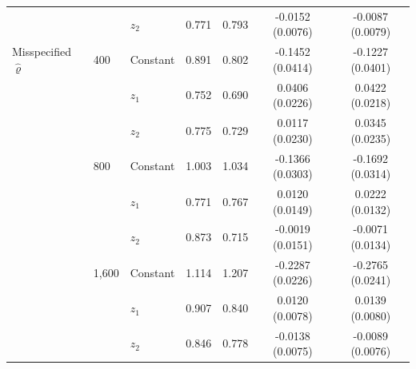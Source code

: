 \begin{tabular}{lllcccc}
 &  & $z_2$ & 0.771 & 0.793 & -0.0152 (0.0076) & -0.0087 (0.0079) \\
\addlinespace
Misspecified $\hat\varrho$ & 400 & Constant & 0.891 & 0.802 & -0.1452 (0.0414) & -0.1227 (0.0401) \\
 &  & $z_1$ & 0.752 & 0.690 & 0.0406 (0.0226) & 0.0422 (0.0218) \\
 &  & $z_2$ & 0.775 & 0.729 & 0.0117 (0.0230) & 0.0345 (0.0235) \\
 & 800 & Constant & 1.003 & 1.034 & -0.1366 (0.0303) & -0.1692 (0.0314) \\
 &  & $z_1$ & 0.771 & 0.767 & 0.0120 (0.0149) & 0.0222 (0.0132) \\
 &  & $z_2$ & 0.873 & 0.715 & -0.0019 (0.0151) & -0.0071 (0.0134) \\
 & 1,600 & Constant & 1.114 & 1.207 & -0.2287 (0.0226) & -0.2765 (0.0241) \\
 &  & $z_1$ & 0.907 & 0.840 & 0.0120 (0.0078) & 0.0139 (0.0080) \\
 &  & $z_2$ & 0.846 & 0.778 & -0.0138 (0.0075) & -0.0089 (0.0076) \\
\bottomrule
\end{tabular}
